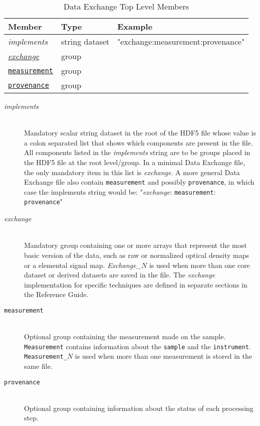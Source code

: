 \begin{table}[h!]\sffamily
\centering
\footnotesize
\caption{Data Exchange Top Level Members}
\label{tab:genrules}
\begin{tabular}{l l l}
\toprule
\bfseries Member     & \bfseries Type & \bfseries Example \\
\midrule

\emph{implements} & string dataset & "exchange:measurement:provenance" \\
\hyperref[sec:exchange]{\emph{exchange}} &  group  & \\
\hyperref[table:measurement]{\tt{measurement}} &  group  & \\
\hyperref[table:provenance]{\tt{provenance}} & group & \\
\bottomrule
\end{tabular}
\end{table}

\begin{description}
\item[\emph{implements}] \hfill \\
{Mandatory scalar string dataset in the root of the HDF5 file whose
value is a colon separated list that shows which components are present in the
file. All components listed in the \emph{implements} string are to be groups
placed in the HDF5 file at the root level/group. In a minimal Data
Exchange file, the only mandatory item in this list is \emph{exchange}. A more
general Data Exchange file also contain {\tt{measurement}} and possibly  
{\tt{provenance}}, in which case the implements string would be:
"\emph{exchange}: {\tt{measurement}}: {\tt{provenance}}"}

\item[\emph{exchange}] \hfill \\
{Mandatory group containing one or more arrays that
represent the most basic version of the data, such as raw or normalized
optical density maps or a elemental signal map.  \emph{Exchange\_$N$} is
used when more than one core dataset or derived datasets are saved in the file.
The \emph{exchange} implementation for specific techniques are defined
in separate sections in the Reference Guide.}

\item[\tt measurement] \hfill \\
{Optional group containing the measurement made on the
sample.  {\tt Measurement} contains information about the {\tt sample}  and
the  {\tt instrument}. {\tt Measurement\_$N$} is used when more than one
measurement is stored in the same file.}

\item[\tt provenance] \hfill \\
{Optional group containing information about the status
of each processing step.}

\end{description}

